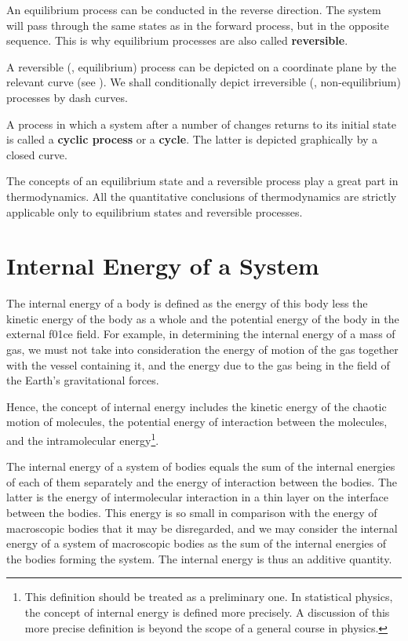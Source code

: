 An equilibrium process can be conducted in the reverse direction. The system will pass through the same states as in the forward process, but in the opposite sequence. This is why equilibrium processes are also called \textbf{reversible}.

A reversible (\ie, equilibrium) process can be depicted on a coordinate plane by the relevant curve (see ). We shall conditionally depict irreversible (\ie, non-equilibrium) processes by dash curves.

A process in which a system after a number of changes returns to its initial state is called a \textbf{cyclic process} or a \textbf{cycle}. The latter is depicted graphically by a closed curve.

The concepts of an equilibrium state and a reversible process play a great part in thermodynamics. All the quantitative conclusions of thermodynamics are strictly applicable only to equilibrium states and reversible processes.

\section{Internal Energy of a System}\label{sec:10_4}

The internal energy of a body is defined as the energy of this body less the kinetic energy of the body as a whole and the potential energy of the body in the external f01ce field. For example, in determining the internal energy of a mass of gas, we must not take into consideration the energy of motion of the gas together with the vessel containing it, and the energy due to the gas being in the field of the Earth's gravitational forces.

Hence, the concept of internal energy includes the kinetic energy of the chaotic motion of molecules, the potential energy of interaction between the molecules, and the intramolecular energy\footnote{This definition should be treated as a preliminary one. In statistical physics, the concept of internal energy is defined more precisely. A discussion of this more precise definition is beyond the scope of a general course in physics.}.

The internal energy of a system of bodies equals the sum of the internal energies of each of them separately and the energy of interaction between the bodies. The latter is the energy of intermolecular interaction in a thin layer on the interface between the bodies. This energy is so small in comparison with the energy of macroscopic bodies that it may be disregarded, and we may consider the internal energy of a system of macroscopic bodies as the sum of the internal energies of the bodies forming the system. The internal energy is thus an additive quantity.

